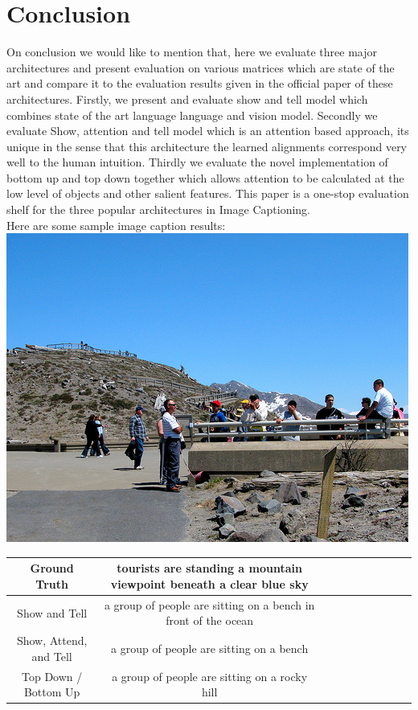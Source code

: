\documentclass[a4paper]{article}
\begin{document}
\section{Conclusion}
On conclusion we would like to mention that, here we evaluate three major architectures and present evaluation on various matrices which are state of the art and compare it to the evaluation results given in the official paper of these architectures. Firstly, we present and evaluate show and tell model which combines state of the art language language and vision model. Secondly we evaluate Show, attention and tell model which is an attention based approach, its unique in the sense that this architecture the learned alignments correspond very well to the human intuition. Thirdly we evaluate the novel implementation of bottom up and top down together which allows attention to be calculated at the low level of objects and other salient features. This paper is a one-stop evaluation shelf for the three popular architectures in Image Captioning.
\\
\noindent
Here are some sample image caption results:
\\
\includegraphics[width=\textwidth]{3562050678_4196a7fff3.jpg}
\\
\begin{center}
 \begin{tabular}{|c| c| c| c| c| c| c | c| c| c|} 
 \hline
 
 Ground Truth & tourists are standing a mountain viewpoint beneath a clear blue sky\\ [0.2ex] 
 \hline
  Show and Tell & a group of people are sitting on a bench in front of the ocean\\ 
 \hline
	Show, Attend, and Tell & a group of people are sitting on a bench\\
 \hline
  Top Down / Bottom Up & a group of people are sitting on a rocky hill\\ 
 \hline
\end{tabular}
\end{center}
\end{document}
